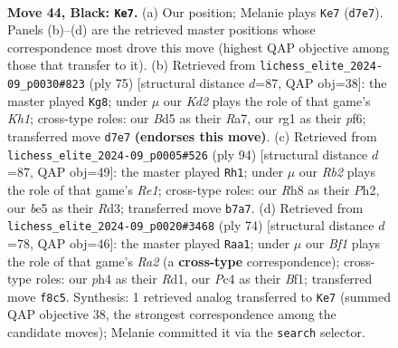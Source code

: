 \documentclass[11pt]{article}
\begin{document}
\clearpage

\begin{figure}[p]\centering
\begin{subfigure}{0.46\textwidth}\centering
\resizebox{\linewidth}{!}{%
\newchessgame
\chessboard[
  setfen={5b1r/1r1k2p1/p1p4p/Pp1bBp2/2p4P/4P1P1/1P1K1P1N/R5R1 b - - 5 44},
  showmover=false,
  pgfstyle=straightmove, color=movearrow, markmove={d7-e7}
]}
\caption{}
\end{subfigure}\hfill
\begin{subfigure}{0.46\textwidth}\centering
\resizebox{\linewidth}{!}{%
\newchessgame
\chessboard[
  setfen={4r2k/r4p2/3b1Pp1/p1pPp1Pp/1pP4P/1P1R1K1B/P3R3/8 b - - 3 38},
  showmover=false,
  pgfstyle=straightmove, color=movearrow, markmove={h8-g8}
]}
\caption{}
\end{subfigure}
\\[4pt]
\begin{subfigure}{0.46\textwidth}\centering
\resizebox{\linewidth}{!}{%
\newchessgame
\chessboard[
  setfen={4r1r1/2kb1p2/4p1p1/1p1pP2p/pP3P2/P1PR2P1/4B2P/2K1R3 w - - 35 48},
  showmover=false,
  pgfstyle=straightmove, color=movearrow, markmove={e1-h1}
]}
\caption{}
\end{subfigure}\hfill
\begin{subfigure}{0.46\textwidth}\centering
\resizebox{\linewidth}{!}{%
\newchessgame
\chessboard[
  setfen={r3b3/rp3p2/5k2/P2P1p2/1p3b1p/1N3PpP/RP4P1/3R1B1K w - - 6 38},
  showmover=false,
  pgfstyle=straightmove, color=movearrow, markmove={a2-a1}
]}
\caption{}
\end{subfigure}
\caption{\textbf{Move 44, Black: \texttt{Ke7}.} (a) Our position; Melanie plays \texttt{Ke7} (\texttt{d7e7}). Panels (b)--(d) are the retrieved master positions whose correspondence most drove this move (highest QAP objective among those that transfer to it). (b) Retrieved from \texttt{lichess\_elite\_2024-09\_p0030\#823} (ply 75) [structural distance $d$=87, QAP obj=38]: the master played \texttt{Kg8}; under $\mu$ our \emph{Kd2} plays the role of that game's \emph{Kh1}; cross-type roles: our \emph{B}d5 as their \emph{R}a7, our \emph{r}g1 as their \emph{p}f6; transferred move \texttt{d7e7} \textbf{(endorses this move)}. (c) Retrieved from \texttt{lichess\_elite\_2024-09\_p0005\#526} (ply 94) [structural distance $d$=87, QAP obj=49]: the master played \texttt{Rh1}; under $\mu$ our \emph{Rb2} plays the role of that game's \emph{Re1}; cross-type roles: our \emph{R}h8 as their \emph{P}h2, our \emph{b}e5 as their \emph{R}d3; transferred move \texttt{b7a7}. (d) Retrieved from \texttt{lichess\_elite\_2024-09\_p0020\#3468} (ply 74) [structural distance $d$=78, QAP obj=46]: the master played \texttt{Raa1}; under $\mu$ our \emph{Bf1} plays the role of that game's \emph{Ra2} (a \textbf{cross-type} correspondence); cross-type roles: our \emph{p}h4 as their \emph{R}d1, our \emph{P}c4 as their \emph{B}f1; transferred move \texttt{f8c5}. Synthesis: 1 retrieved analog transferred to \texttt{Ke7} (summed QAP objective 38, the strongest correspondence among the candidate moves); Melanie committed it via the \texttt{search} selector.}
\label{fig:thought-m87}
\end{figure}
\end{document}
